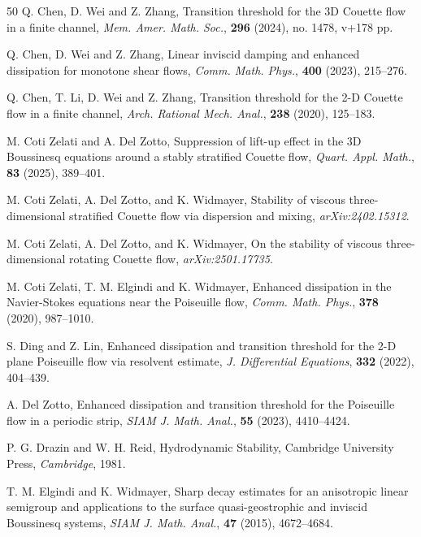 \documentclass[11pt,reqno]{article}
\numberwithin{equation}{section}
\begin{document}
\begin{thebibliography}{50}
 Q. Chen, D. Wei and Z. Zhang, 	Transition threshold for the 3D Couette flow in a finite channel, \textit{Mem. Amer. Math. Soc.}, \textbf{296} (2024), no. 1478, v+178 pp. 


 Q. Chen, D. Wei and Z. Zhang, Linear inviscid damping and enhanced dissipation for monotone shear
flows, \textit{Comm. Math. Phys.}, \textbf{400} (2023), 215--276.

Q. Chen, T. Li, D. Wei and Z. Zhang, Transition threshold for the 2-D Couette flow in a finite channel,
\textit{Arch. Rational Mech. Anal.}, \textbf{238} (2020), 125--183.


 M. Coti Zelati and A. Del Zotto,
Suppression of lift-up effect in the 3D Boussinesq equations around a stably stratified Couette flow, 
\textit{Quart. Appl. Math.}, \textbf{83} (2025), 389--401.


M. Coti Zelati, A. Del Zotto, and K. Widmayer, Stability of viscous three-dimensional stratified Couette flow via dispersion
and mixing, \textit{arXiv:2402.15312}.


M. Coti Zelati, A. Del Zotto, and K. Widmayer, On the stability of viscous three-dimensional rotating Couette flow, \textit{arXiv:2501.17735}.


 M. Coti Zelati, T. M. Elgindi and K. Widmayer, Enhanced dissipation in the Navier-Stokes equations near the Poiseuille flow, \textit{Comm. Math. Phys.}, \textbf{378} (2020), 987--1010.

	S. Ding and Z. Lin, Enhanced dissipation and transition threshold for the 2-D plane Poiseuille flow via resolvent estimate, \textit{J. Differential Equations}, \textbf{332} (2022), 404--439.


	A. Del Zotto, Enhanced dissipation and transition threshold for the Poiseuille flow in a periodic strip, \textit{SIAM J. Math. Anal.}, \textbf{55} (2023), 4410--4424.



 	P. G. Drazin and W. H. Reid, Hydrodynamic Stability, Cambridge University Press, \textit{Cambridge}, 1981.	

T. M. Elgindi and K. Widmayer, Sharp decay estimates for an anisotropic linear semigroup and applications to the surface quasi-geostrophic and inviscid Boussinesq systems, \textit{SIAM J. Math. Anal.}, \textbf{47} (2015), 4672–4684.



\end{thebibliography}
\end{document}
